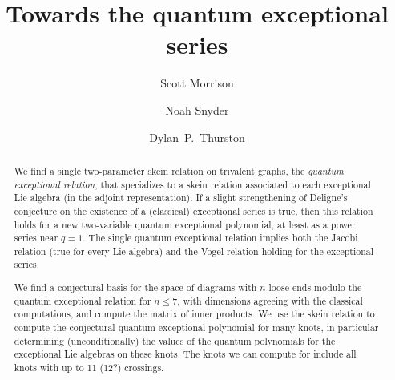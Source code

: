 \documentclass[12pt]{amsart}
\begin{document}
\title{Towards the quantum exceptional series}

\author[Morrison]{Scott Morrison}
\address{Mathematical Sciences Institute, Australian National University}

\author[Snyder]{Noah Snyder}
\address{Bloomington, Indiana, USA}

\author[Thurston]{Dylan~P.~Thurston}
\address{Bloomington, Indiana, USA}

\begin{abstract}
  We find a single two-parameter skein relation on trivalent graphs,
  the \emph{quantum exceptional relation}, that specializes to a skein
  relation associated to each exceptional Lie algebra (in the adjoint
  representation). If a slight
  strengthening of Deligne's conjecture on the existence of a
  (classical) exceptional series is true, then this relation
  holds for a new two-variable quantum exceptional polynomial, at
  least as a power series near $q=1$. The
  single quantum exceptional relation implies both the
  Jacobi relation (true for every Lie algebra) and
  the Vogel relation holding for the exceptional series.

  We find a conjectural basis for the space of diagrams with $n$ loose
  ends modulo the quantum exceptional relation for $n \le 7$, with
  dimensions agreeing with the classical computations, and compute
  the matrix of inner products. 
  We use the
  skein relation to compute the conjectural quantum exceptional
  polynomial for many knots, in particular
  determining (unconditionally) the values of the quantum polynomials
  for the exceptional Lie algebras on
  these knots. The knots we can compute for include all knots with up
  to 11 (12?) crossings.
\end{abstract}


\maketitle

\tableofcontents
\end{document}
